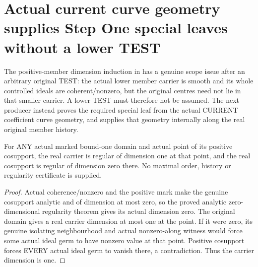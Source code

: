 \section{Actual current curve geometry supplies Step One special leaves without a lower TEST}

The positive-member dimension induction in
\cite[Section~5, Step~I.A]{bierstone-milman08-functoriality} has a genuine
scope issue after an arbitrary original TEST: the actual lower member
carrier is smooth and its whole controlled ideals are coherent/nonzero,
but the original centres need not lie in that smaller carrier. A lower
TEST must therefore not be assumed. The next producer instead proves
the required special leaf from the actual CURRENT coefficient curve
geometry, and supplies that geometry internally along the real original
member history.

\begin{lemma}
\label{hir:original-curve-current-cosupport-regular-dimensions}
\leanok
For ANY actual marked bound-one domain and actual point of its positive
cosupport, the real carrier is regular of dimension one at that point,
and the real cosupport is regular of dimension zero there. No maximal
order, history or regularity certificate is supplied.
\end{lemma}
\begin{proof}
Actual coherence/nonzero and the positive mark make the genuine
cosupport analytic and of dimension at most zero, so the proved analytic
zero-dimensional regularity theorem gives its actual dimension zero.
The original domain gives a real carrier dimension at most one at the
point. If it were zero, its genuine isolating neighbourhood and actual
nonzero-along witness would force some actual ideal germ to have nonzero
value at that point. Positive cosupport forces EVERY actual ideal germ
to vanish there, a contradiction. Thus the carrier dimension is one.
\end{proof}

